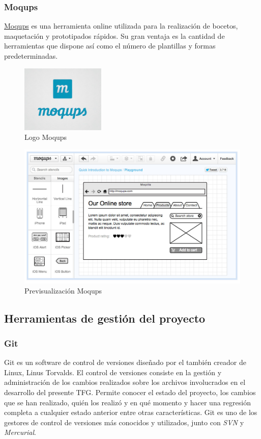 		\subsubsection{Moqups}		
		\href{https://moqups.com}{Moqups} es una herramienta online utilizada para la realización de bocetos, maquetación y prototipados rápidos. Su gran ventaja es la cantidad de herramientas que dispone así como el número de plantillas y formas predeterminadas.
			
		\begin{figure}[H]
		\centering
		\includegraphics[width=40mm, fbox={\fboxrule} 4mm]{images/04-metodo/16-moqups_logo.png}
		\caption{Logo Moqups}
		\label{fig:gantt-project-logo}
		\end{figure}
		
		\begin{figure}[H]
		\centering
		\includegraphics[width=120mm, fbox={\fboxrule} 4mm]{images/04-metodo/17-moqups_preview.jpg}
		\caption{Previsualización Moqups}
		\label{fig:gantt-project-logo}
		\end{figure}
		
	\subsection{Herramientas de gestión del proyecto}
		\subsubsection{Git}
		Git es un software de control de versiones diseñado por el también creador de Linux, Linus Torvalds. El control de versiones consiste en la gestión y administración de los cambios realizados sobre los archivos involucrados en el desarrollo del presente \ac{TFG}. Permite conocer el estado del proyecto, los cambios que se han realizado, quién los realizó y en qué momento y hacer una regresión completa a cualquier estado anterior entre otras características.
		Git es uno de los gestores de control de versiones más conocidos y utilizados, junto con \textit{\ac{SVN}} y \textit{Mercurial}.
		
